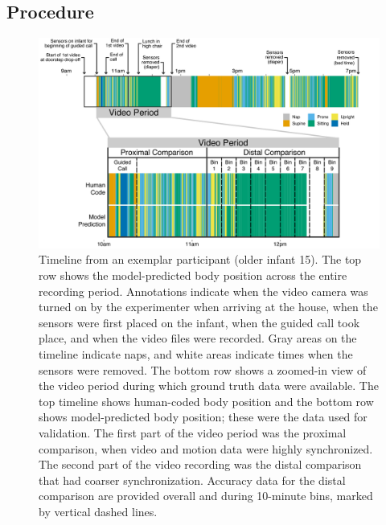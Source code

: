 \documentclass[
  man]{apa6}
\begin{document}
\hypertarget{procedure}{%
\subsection{Procedure}\label{procedure}}

\begin{figure}

{\centering \includegraphics[width=0.99\linewidth]{figures/timeline} 

}

\caption{Timeline from an exemplar participant (older infant 15). The top row shows the model-predicted body position across the entire recording period. Annotations indicate when the video camera was turned on by the experimenter when arriving at the house, when the sensors were first placed on the infant, when the guided call took place, and when the video files were recorded. Gray areas on the timeline indicate naps, and white areas indicate times when the sensors were removed. The bottom row shows a zoomed-in view of the video period during which ground truth data were available. The top timeline shows human-coded body position and the bottom row shows model-predicted body position; these were the data used for validation. The first part of the video period was the proximal comparison, when video and motion data were highly synchronized. The second part of the video recording was the distal comparison that had coarser synchronization. Accuracy data for the distal comparison are provided overall and during 10-minute bins, marked by vertical dashed lines.}\label{fig:exemplar-timeline}
\end{figure}
\end{document}
